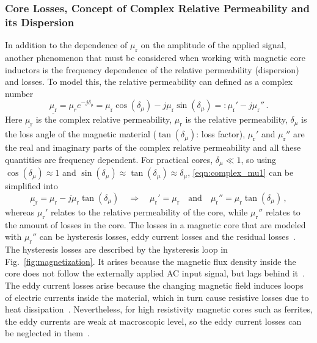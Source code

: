 \subsubsection{Core Losses, Concept of Complex Relative Permeability and its Dispersion}
In addition to the dependence of $\mu_\mathrm{r}$ on the amplitude of the applied signal, another phenomenon that must be considered when working with magnetic core inductors is the frequency dependence of the relative permeability (dispersion) and losses. To model this, the relative permeability can defined as a complex number
\begin{equation}\label{eqn:complex_mu1}
	\underline{\mu_\mathrm{r}} = \mu_re^{-j\delta_\mathrm{\mu}} = \mu_\mathrm{r}\cos(\delta_\mu) - j\mu_\mathrm{r}\sin(\delta_\mu) =: \mu_\mathrm{r}' - j\mu_\mathrm{r}''\,.
\end{equation}
Here $\underline{\mu_\mathrm{r}}$ is the complex relative permeability, $\mu_\mathrm{r}$ is the relative permeability, $\delta_\mu$ is the loss angle of the magnetic material ($\tan(\delta_\mu)$: loss factor), $\mu_\mathrm{r}'$ and $\mu_\mathrm{r}''$ are the real and imaginary parts of the complex relative permeability and all these quantities are frequency dependent. For practical cores, $\delta_\mu \ll 1$, so using $\cos(\delta_\mu) \approx 1$ and $\sin(\delta_\mu) \approx \tan(\delta_\mu) \approx \delta_\mu$, \eqref{eqn:complex_mu1} can be simplified into 
\begin{equation} \label{eqn:complex_mu2}
	\underline{\mu_\mathrm{r}} = \mu_\mathrm{r} - j\mu_\mathrm{r}\tan(\delta_\mu) \quad\Longrightarrow\quad \mu_\mathrm{r}' = \mu_\mathrm{r} 
	\quad\mathrm{and}\quad
	\mu_\mathrm{r}'' = \mu_\mathrm{r}\tan(\delta_\mu)\,, 
\end{equation}
whereas $\mu_\mathrm{r}'$ relates to the relative permeability of the core, while $\mu_\mathrm{r}''$ relates to the amount of losses in the core. The losses in a magnetic core that are modeled with $\mu_\mathrm{r}''$ can be hysteresis losses, eddy current losses and the residual losses~\cite{snelling}. The hysteresis losses are described by the hysteresis loop in Fig.~\ref{fig:magnetization}. It arises because the magnetic flux density inside the core does not follow the externally applied AC input signal, but lags behind it~\cite{snelling}. The eddy current losses arise because the changing magnetic field induces loops of electric currents inside the material, which in turn cause resistive losses due to heat dissipation~\cite{snelling}. Nevertheless, for high resistivity magnetic cores such as ferrites, the eddy currents are weak at macroscopic level, so the eddy current losses can be neglected in them~\cite{wijn}.


